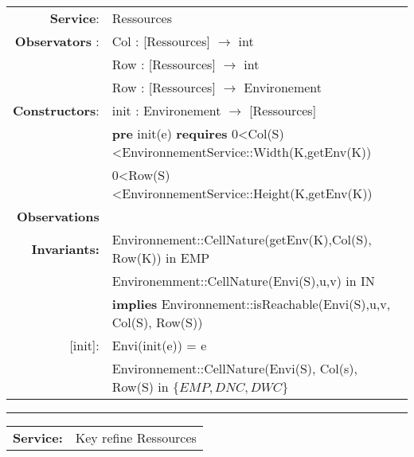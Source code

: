 \begin{tabular}{rl}
\textbf{Service}: & Ressources\\
\textbf{Observators} : & 
Col : [Ressources] $\rightarrow$ int\\
&
Row : [Ressources] $\rightarrow$ int\\
&
Row : [Ressources] $\rightarrow$ Environement\\
\textbf{Constructors}:& init : Environement $\rightarrow$ [Ressources] \\
& \quad \textbf{pre} init(e) \textbf{requires}  0<Col(S)<EnvironnementService::Width(K,getEnv(K))\\
&
0<Row(S)<EnvironnementService::Height(K,getEnv(K))\\

\textbf{Observations}\\
\textbf{Invariants:} & Environnement::CellNature(getEnv(K),Col(S), Row(K)) in {EMP}\\
&
Environemment::CellNature(Envi(S),u,v) in {IN}\\ &
\quad \textbf{implies} Environnement::isReachable(Envi(S),u,v, Col(S), Row(S))\\

[init]: & Envi(init(e)) = e\\
& Environnement::CellNature(Envi(S), Col(s), Row(S) in $\{EMP,DNC,DWC\}$
\end{tabular}

\vspace{5mm}\hrule\vspace{5mm}
\begin{tabular}{rl}
\textbf{Service:} & \quad Key refine Ressources
\end{tabular}
